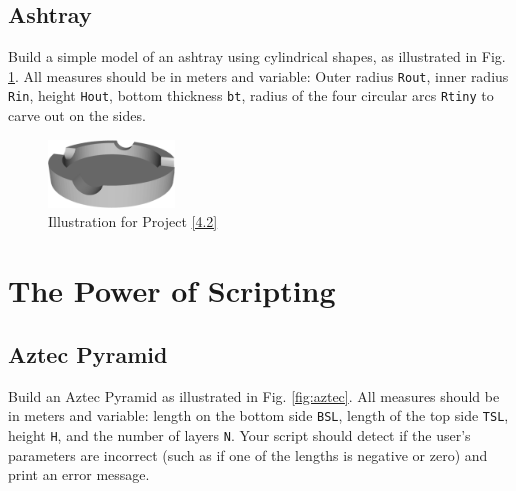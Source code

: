 \subsection{Ashtray} \label{4.3}
Build a simple model of an ashtray using cylindrical shapes, 
as illustrated in Fig. \ref{fig:ashtray}. All measures should be 
in meters and variable: Outer radius {\tt Rout}, inner radius {\tt Rin},
height {\tt Hout}, bottom thickness {\tt bt}, radius of the four 
circular arcs {\tt Rtiny} to carve out on the sides.

\begin{figure}[!ht]
\begin{center}
\includegraphics[width=0.3\textwidth]{img/ashtray.png}
\end{center}
\vspace{-2mm}
\caption{Illustration for Project \ref{4.2}}
\label{fig:ashtray}
\end{figure}
\noindent






\section{The Power of Scripting}

\subsection{Aztec Pyramid} \label{6.1}
Build an Aztec Pyramid as illustrated in Fig. \ref{fig:aztec}. All measures should be 
in meters and variable: length 
on the bottom side {{\tt BSL}}, length of the top side {\tt TSL}, 
height {\tt H}, and the number of layers {\tt N}. Your script should 
detect if the user's parameters are incorrect (such as if one of the lengths is negative or 
zero) and print an error message.


